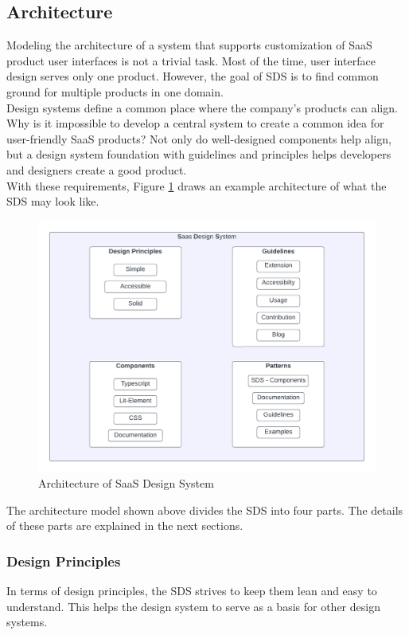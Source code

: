 \subsection{Architecture}
Modeling the architecture of a system that supports customization of SaaS product user interfaces is not a trivial task. Most of the time, user interface design serves only one product. However, the goal of \ac{SDS} is to find common ground for multiple products in one domain. \\
Design systems define a common place where the company's products can align. Why is it impossible to develop a central system to create a common idea for user-friendly SaaS products? Not only do well-designed components help align, but a design system foundation with guidelines and principles helps developers and designers create a good product. \\

With these requirements, Figure \ref{architecture_sds} draws an example architecture of what the SDS may look like.\\
\begin{figure}[htbp]
\centerline{\includegraphics[width=\linewidth]{images/architecture_sds.png}}
\caption{Architecture of SaaS Design System}
\label{architecture_sds}
\end{figure}

The architecture model shown above divides the \acl{SDS} into four parts. The details of these parts are explained in the next sections.
\subsubsection{Design Principles}
In terms of design principles, the \ac{SDS} strives to keep them lean and easy to understand. This helps the design system to serve as a basis for other design systems. \\

